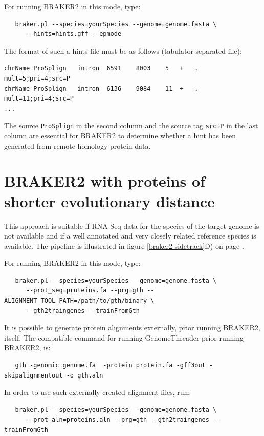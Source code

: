\documentclass[a4paper,10pt]{report}
\begin{document}
For running BRAKER2 in this mode, type:

\begin{verbatim}
   braker.pl --species=yourSpecies --genome=genome.fasta \
      --hints=hints.gff --epmode
\end{verbatim}

The format of such a hints file must be as follows (tabulator separated file):

\begin{verbatim}
chrName	ProSplign	intron	6591	8003	5	+	.	mult=5;pri=4;src=P
chrName	ProSplign	intron	6136	9084	11	+	.	mult=11;pri=4;src=P
...
\end{verbatim}

The source \texttt{ProSplign} in the second column and the source tag \texttt{src=P} in the last column are essential for BRAKER2 to determine whether a hint has been generated from remote homology protein data. 

\section{BRAKER2 with proteins of shorter evolutionary distance}

This approach is suitable if RNA-Seq data for the species of the target genome is not available and if a well annotated and very closely related reference species is available. The pipeline is illustrated in figure \ref{braker2-sidetrack}D) on page \pageref{braker2-sidetrack}.

For running BRAKER2 in this mode, type:

\begin{verbatim}
   braker.pl --species=yourSpecies --genome=genome.fasta \
      --prot_seq=proteins.fa --prg=gth --ALIGNMENT_TOOL_PATH=/path/to/gth/binary \
      --gth2traingenes --trainFromGth
\end{verbatim}

It is possible to generate protein alignments externally, prior running BRAKER2, itself. The compatible command for running GenomeThreader prior running BRAKER2, is:

\begin{verbatim}
   gth -genomic genome.fa  -protein protein.fa -gff3out -skipalignmentout -o gth.aln
\end{verbatim}


In order to use such externally created alignment files, run:

\begin{verbatim}
   braker.pl --species=yourSpecies --genome=genome.fasta \
      --prot_aln=proteins.aln --prg=gth --gth2traingenes --trainFromGth
\end{verbatim}
\end{document}
